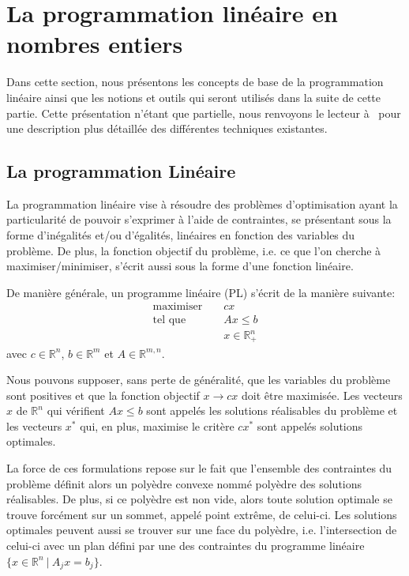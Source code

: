 
\section{La programmation linéaire en nombres entiers}

Dans cette section, nous présentons les concepts de base de la
programmation linéaire ainsi que les notions et outils qui seront
utilisés dans la suite de cette partie. Cette présentation n'étant que
partielle, nous renvoyons le lecteur à~\cite{LP} pour une description
plus détaillée des différentes techniques existantes.

\subsection{La programmation Linéaire}

La programmation linéaire vise à résoudre des problèmes
d'optimisation ayant la particularité de pouvoir s'exprimer à
l'aide de contraintes, se présentant sous la forme d'inégalités
et/ou d'égalités, linéaires en fonction des variables du problème.
De plus, la fonction objectif du problème, i.e. ce que l'on
cherche à maximiser/minimiser, s'écrit aussi sous la forme d'une
fonction linéaire.

De manière générale, un programme linéaire (PL) s'écrit de la manière
suivante: 
 \[ \begin{array}{lcl}
\text{maximiser } & & \displaystyle cx\\ 
\text{tel que }& & \displaystyle Ax \le b\\
 & & \displaystyle x \in \mathbb{R}^n_+
 \end{array}
\]
avec $c \in \mathbb{R}^n$, $b \in \mathbb{R}^m$ et $A \in
\mathbb{R}^{m,n}$. 

Nous pouvons supposer, sans perte de généralité, que les variables du
problème sont positives et que la fonction objectif $x\rightarrow cx$
doit être maximisée. Les vecteurs $x$ de $\mathbb{R}^n$ qui vérifient
$Ax \le b$ sont appelés les solutions réalisables du problème et les
vecteurs $x^*$ qui, en plus, maximise le critère $cx^*$ sont appelés
solutions optimales.    

La force de ces formulations repose sur le fait que l'ensemble des
contraintes du problème définit alors un polyèdre convexe nommé
polyèdre des solutions réalisables. De plus, si ce polyèdre est non
vide, alors toute solution optimale se trouve forcément sur un sommet,
appelé point extrême, de celui-ci. Les solutions optimales peuvent aussi
se trouver sur une face du polyèdre, i.e. l'intersection de celui-ci
avec un plan défini par une des contraintes du programme linéaire $\{x
\in \mathbb{R}^n\ | \ A_jx=b_j\}$. 

